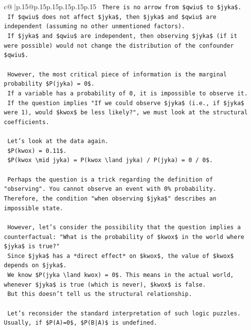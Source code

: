 \documentclass{article}
\begin{document}
{\begin{supertabular}{c@{$\;$}|p{.15\linewidth}@{}p{.15\linewidth}p{.15\linewidth}p{.15\linewidth}p{.15\linewidth}p{.15\linewidth}}
{{{\texttt{        There is no arrow from \$qwiu\$ to \$jyka\$.} \\
\texttt{        If \$qwiu\$ does not affect \$jyka\$, then \$jyka\$ and \$qwiu\$ are independent (assuming no other unmentioned factors).} \\
\texttt{        If \$jyka\$ and \$qwiu\$ are independent, then observing \$jyka\$ (if it were possible) would not change the distribution of the confounder \$qwiu\$.} \\
\\ 
\texttt{        However, the most critical piece of information is the marginal probability \$P(jyka) = 0\$.} \\
\texttt{        If a variable has a probability of 0, it is impossible to observe it.} \\
\texttt{        If the question implies "If we could observe \$jyka\$ (i.e., if \$jyka\$ were 1), would \$kwox\$ be less likely?", we must look at the structural coefficients.} \\
\\ 
\texttt{        Let's look at the data again.} \\
\texttt{        \$P(kwox) = 0.11\$.} \\
\texttt{        \$P(kwox \textbackslash{}mid jyka) = P(kwox \textbackslash{}land jyka) / P(jyka) = 0 / 0\$.} \\
\\ 
\texttt{        Perhaps the question is a trick regarding the definition of "observing". You cannot observe an event with 0\% probability. Therefore, the condition "when observing \$jyka\$" describes an impossible state.} \\
\\ 
\texttt{        However, let's consider the possibility that the question implies a counterfactual: "What is the probability of \$kwox\$ in the world where \$jyka\$ is true?"} \\
\texttt{        Since \$jyka\$ has a *direct effect* on \$kwox\$, the value of \$kwox\$ depends on \$jyka\$.} \\
\texttt{        We know \$P(jyka \textbackslash{}land kwox) = 0\$. This means in the actual world, whenever \$jyka\$ is true (which is never), \$kwox\$ is false.} \\
\texttt{        But this doesn't tell us the structural relationship.} \\
\\ 
\texttt{        Let's reconsider the standard interpretation of such logic puzzles. Usually, if \$P(A)=0\$, \$P(B|A)\$ is undefined.} \\
}}}
\end{supertabular}}
\end{document}
